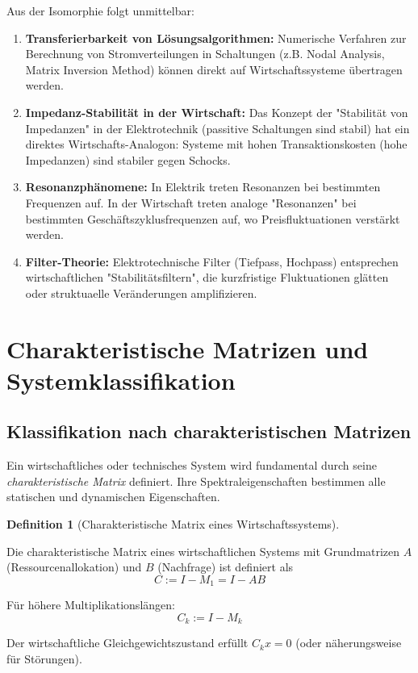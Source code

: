 \documentclass[a4paper,12pt]{article}
\theoremstyle{definition}
\newtheorem{definition}{Definition}
\begin{document}
Aus der Isomorphie folgt unmittelbar:

\begin{enumerate}
\item \textbf{Transferierbarkeit von Lösungsalgorithmen:} Numerische Verfahren zur Berechnung von Stromverteilungen in Schaltungen (z.B. Nodal Analysis, Matrix Inversion Method) können direkt auf Wirtschaftssysteme übertragen werden.

\item \textbf{Impedanz-Stabilität in der Wirtschaft:} Das Konzept der "Stabilität von Impedanzen" in der Elektrotechnik (passitive Schaltungen sind stabil) hat ein direktes Wirtschafts-Analogon: Systeme mit hohen Transaktionskosten (hohe Impedanzen) sind stabiler gegen Schocks.

\item \textbf{Resonanzphänomene:} In Elektrik treten Resonanzen bei bestimmten Frequenzen auf. In der Wirtschaft treten analoge "Resonanzen" bei bestimmten Geschäftszyklusfrequenzen auf, wo Preisfluktuationen verstärkt werden.

\item \textbf{Filter-Theorie:} Elektrotechnische Filter (Tiefpass, Hochpass) entsprechen wirtschaftlichen "Stabilitätsfiltern", die kurzfristige Fluktuationen glätten oder struktuaelle Veränderungen amplifizieren.
\end{enumerate}

\section{Charakteristische Matrizen und Systemklassifikation}

\subsection{Klassifikation nach charakteristischen Matrizen}

Ein wirtschaftliches oder technisches System wird fundamental durch seine \emph{charakteristische Matrix} definiert. Ihre Spektraleigenschaften bestimmen alle statischen und dynamischen Eigenschaften.

\begin{definition}[Charakteristische Matrix eines Wirtschaftssystems]
\label{def:char_matrix}

Die charakteristische Matrix eines wirtschaftlichen Systems mit Grundmatrizen $A$ (Ressourcenallokation) und $B$ (Nachfrage) ist definiert als
\[
C := I - M_1 = I - AB
\]

Für höhere Multiplikationslängen:
\[
C_k := I - M_k
\]

Der wirtschaftliche Gleichgewichtszustand erfüllt $C_k x = 0$ (oder näherungsweise für Störungen).
\end{definition}
\end{document}
